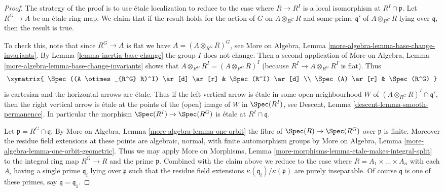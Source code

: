 \begin{proof}
The strategy of the proof is to use \'etale localization to
reduce to the case where $R \to R^I$ is a local isomorphism at
$R^I \cap \mathfrak p$.
Let $R^G \to A$ be an \'etale ring map. We claim that if the result
holds for the action of $G$ on $A \otimes_{R^G} R$ and some prime
$\mathfrak q'$ of $A \otimes_{R^G} R$ lying over $\mathfrak q$, then
the result is true.

\medskip\noindent
To check this, note that since $R^G \to A$ is flat we have
$A = (A \otimes_{R^G} R)^G$, see More on Algebra,
Lemma \ref{more-algebra-lemma-base-change-invariants}.
By Lemma \ref{lemma-inertia-base-change} the group $I$ does not change.
Then a second application of More on Algebra,
Lemma \ref{more-algebra-lemma-base-change-invariants}
shows that $A \otimes_{R^G} R^I = (A \otimes_{R^G} R)^I$
(because $R^I \to A \otimes_{R^G} R^I$ is flat).
Thus
$$
\xymatrix{
\Spec((A \otimes_{R^G} R)^I) \ar[d] \ar[r] & \Spec(R^I) \ar[d] \\
\Spec(A) \ar[r] & \Spec(R^G)
}
$$
is cartesian and the horizontal arrows are \'etale. Thus if the
left vertical arrow is \'etale in some open neighbourhood $W$ of
$(A \otimes_{R^G} R)^I \cap \mathfrak q'$, then the right vertical
arrow is \'etale at the points of the (open) image of $W$ in
$\Spec(R^I)$, see
Descent, Lemma \ref{descent-lemma-smooth-permanence}. In particular
the morphism $\Spec(R^I) \to \Spec(R^G)$ is \'etale at $R^I \cap \mathfrak q$.

\medskip\noindent
Let $\mathfrak p = R^G \cap \mathfrak q$.
By More on Algebra, Lemma \ref{more-algebra-lemma-one-orbit}
the fibre of $\Spec(R) \to \Spec(R^G)$ over $\mathfrak p$ is
finite. Moreover the residue field extensions at these points
are algebraic, normal, with finite automorphism groups by
More on Algebra, Lemma \ref{more-algebra-lemma-one-orbit-geometric}.
Thus we may apply
More on Morphisms,
Lemma \ref{more-morphisms-lemma-etale-makes-integral-split}
to the integral ring map $R^G \to R$ and the prime $\mathfrak p$.
Combined with the claim above we reduce to the case where
$R = A_1 \times \ldots \times A_n$ with each $A_i$ having a single
prime $\mathfrak q_i$ lying over $\mathfrak p$ such that the
residue field extensions $\kappa(\mathfrak q_i)/\kappa(\mathfrak p)$
are purely inseparable. Of course $\mathfrak q$ is one of
these primes, say $\mathfrak q = \mathfrak q_1$.


\end{proof}
